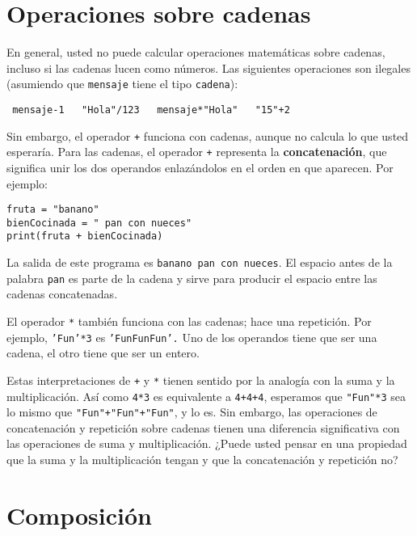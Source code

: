 \section{Operaciones sobre cadenas}


En general, usted no puede calcular operaciones matemáticas sobre
cadenas, incluso si las cadenas lucen como números. Las siguientes
operaciones son ilegales (asumiendo que \texttt{mensaje} tiene el
tipo \texttt{cadena}):

\begin{lstlisting}
 mensaje-1   "Hola"/123   mensaje*"Hola"   "15"+2
\end{lstlisting}

Sin embargo, el operador \texttt{+} funciona con cadenas, aunque no
calcula lo que usted esperaría. Para las cadenas, el operador \texttt{+}
representa la \textbf{concatenación}, que significa unir los dos operandos
enlazándolos en el orden en que aparecen. Por ejemplo:


\begin{lstlisting}
fruta = "banano"
bienCocinada = " pan con nueces"
print(fruta + bienCocinada)
\end{lstlisting}

La salida de este programa es \texttt{banano pan con nueces}. El espacio
antes de la palabra \texttt{pan} es parte de la cadena y sirve para
producir el espacio entre las cadenas concatenadas.

El operador \texttt{{*}} también funciona con las cadenas; hace una
repetición. Por ejemplo, \texttt{'Fun'{*}3} es \texttt{'FunFunFun'.}
Uno de los operandos tiene que ser una cadena, el otro tiene que ser
un entero.

Estas interpretaciones de \texttt{+} y \texttt{{*}} tienen sentido
por la analogía con la suma y la multiplicación. Así como \texttt{4{*}3}
es equivalente a \texttt{4+4+4}, esperamos que \verb+"Fun"*3+ sea
lo mismo que {\verb/"Fun"+"Fun"+"Fun"/}, y lo es. Sin embargo,
las operaciones de concatenación y repetición sobre cadenas tienen
una diferencia significativa con las operaciones de suma y multiplicación.
¿Puede usted pensar en una propiedad que la suma y la multiplicación
tengan y que la concatenación y repetición no?

\section{Composición}


